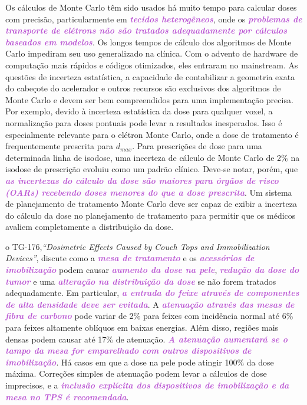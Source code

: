 \documentclass[11pt,a4paper]{article}
\newcounter{exemplo}
\begin{document}
	Os cálculos de Monte Carlo têm sido usados há muito tempo para calcular doses com precisão, particularmente em \textcolor{MediumOrchid}{\textbf{\textit{tecidos heterogêneos}}}, onde os \textcolor{MediumOrchid}{\textbf{\textit{problemas de transporte de elétrons não são tratados adequadamente por cálculos baseados em modelos}}}. Os longos tempos de cálculo dos algoritmos de Monte Carlo impediram seu uso generalizado na clínica. Com o advento de hardware de computação mais rápidos e códigos otimizados, eles entraram no mainstream. As questões de incerteza estatística, a capacidade de contabilizar a geometria exata do cabeçote do acelerador e outros recursos são exclusivos dos algoritmos de Monte Carlo e devem ser bem compreendidos para uma implementação precisa. Por exemplo, devido à incerteza estatística da dose para qualquer voxel, a normalização para doses pontuais pode levar a resultados inesperados. Isso é especialmente relevante para o elétron Monte Carlo, onde a dose de tratamento é frequentemente prescrita para $d_{max}$. Para prescrições de dose para uma determinada linha de isodose, uma incerteza de cálculo de Monte Carlo de 2\% na isodose de prescrição evoluiu como um padrão clínico. Deve-se notar, porém, que \textcolor{MediumOrchid}{\textbf{\textit{as incertezas do cálculo da dose são maiores para órgãos de risco (OARs) recebendo doses menores do que a dose prescrita}}}. Um sistema de planejamento de tratamento Monte Carlo deve ser capaz de exibir a incerteza do cálculo da dose no planejamento de tratamento para permitir que os médicos avaliem completamente a distribuição da dose.

	o TG-176,\textit{``Dosimetric Effects Caused by Couch Tops and Immobilization Devices''}, discute como a \textcolor{MediumOrchid}{\textbf{\textit{mesa de tratamento}}} e os \textcolor{MediumOrchid}{\textbf{\textit{acessórios de imobilização}}} podem causar \textcolor{MediumOrchid}{\textbf{\textit{aumento da dose na pele}}}, \textcolor{MediumOrchid}{\textbf{\textit{redução da dose do tumor}}} e uma \textcolor{MediumOrchid}{\textbf{\textit{alteração na distribuição da dose}}} se não forem tratados adequadamente. Em particular, \textcolor{MediumOrchid}{\textbf{\textit{a entrada do feixe através de componentes de alta densidade deve ser evitada}}}. A \textcolor{MediumOrchid}{\textbf{\textit{atenuação através das mesas de fibra de carbono}}} pode variar de 2\% para feixes com incidência normal até 6\% para feixes altamente oblíquos em baixas energias. Além disso, regiões mais densas podem causar até 17\% de atenuação. \textcolor{MediumOrchid}{\textbf{\textit{A atenuação aumentará se o tampo da mesa for emparelhado com outros dispositivos de imobilização}}}. Há casos em que a dose na pele pode atingir 100\% da dose máxima. Correções simples de atenuação podem levar a cálculos de dose imprecisos, e a \textcolor{MediumOrchid}{\textbf{\textit{inclusão explícita dos dispositivos de imobilização e da mesa no TPS é recomendada}}}.
\end{document}
